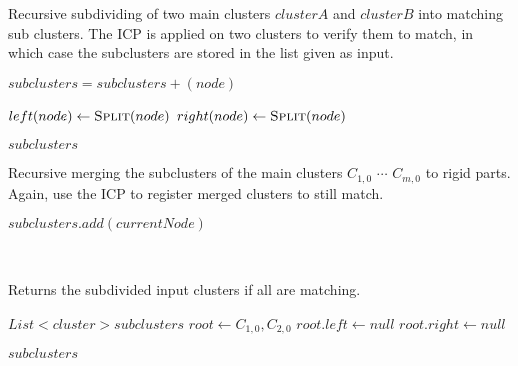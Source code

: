 \begin{algorithm}[tbp]
	\caption{Recursive subdividing of two main clusters $clusterA$ and $clusterB$ into matching sub clusters. The ICP is applied on two clusters to verify them to match, in which case the subclusters are stored in the list given as input.}
	\label{alg:clustering}
	
	\begin{algorithmic}[1]     %
		\label{clustering}
		
		
		\State $subclusters = subclusters + (node)$
		
		\Else
		\State $left(node) \gets \Call{Split}{node}$
		\State $right(node) \gets \Call{Split}{node}$
		\State {}
		\State {}
		
		\EndIf
		\EndProcedure
		
		\State\Return $\mathit{subclusters}$
		
		\EndProcedure	
	\end{algorithmic}
\end{algorithm}

\begin{algorithm}[tbp]
	\caption{Recursive merging the subclusters of the main clusters $C_{1,0}$ $\cdots$ $C_{m,0}$ to rigid parts. Again, use the ICP to register merged clusters to still match.}
	\label{alg:merging}
	
	\begin{algorithmic}[1]     %
		\label{merging}
		
		\State $subclusters.add(currentNode)$
		
		\Else
		\State {}
		\State {}
		\State {}
		
		\EndIf
		\\
		
		\EndProcedure	
		
		
		\Statex Returns the subdivided input clusters if all are matching.
		
		\State $List<cluster> subclusters$
		\State $root \gets C_{1,0}, C_{2,0}$
		\State $root.left \gets null$
		\State $root.right \gets null$
		
		
		\State\Return $\mathit{subclusters}$
		
		\EndProcedure
	\end{algorithmic}
\end{algorithm}

